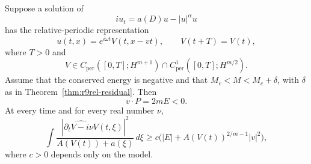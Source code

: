 \begin{theorem}\label{thm:r9rel-periodic}
Suppose a solution of
\[
 iu_t=a(D)u-|u|^\alpha u
\]
has the relative-periodic representation
\[
 u(t,x)=e^{i\omega t}V(t,x-vt),\qquad V(t+T)=V(t),
\]
where $T>0$ and
\begin{equation}\label{eq:r9rel-periodicregularity}
 V\in C_{\mathrm{per}}([0,T];H^{m+1})
 \cap C^1_{\mathrm{per}}([0,T];H^{m/2}).
\end{equation}
Assume that the conserved energy is negative and that
$M_c<M<M_c+\delta$, with $\delta$ as in
Theorem~\ref{thm:r9rel-residual}. Then
\begin{equation}\label{eq:r9rel-periodicpohozaev}
 v\cdot P=2mE<0.
\end{equation}
At every time and for every real number $\nu$,
\begin{equation}\label{eq:r9rel-shapespeed}
 \int\frac{|\widehat{\partial_tV-i\nu V}(t,\xi)|^2}
 {A(V(t))+a(\xi)}\,d\xi
 \ge c\bigl(|E|+A(V(t))^{2/m-1}|v|^2\bigr),
\end{equation}
where $c>0$ depends only on the model.
\end{theorem}
